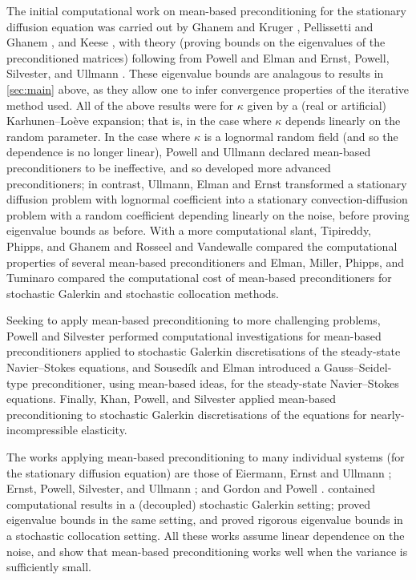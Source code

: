 The initial computational work on mean-based preconditioning for the stationary diffusion equation was carried out by Ghanem and Kruger \cite{GhKr:96}, Pellissetti and Ghanem \cite{PeGh:00}, and Keese \cite{Ke:04}, with theory (proving bounds on the eigenvalues of the preconditioned matrices) following from Powell and Elman \cite{PoEl:09} and Ernst, Powell, Silvester, and Ullmann \cite{ErPoSiUl:09}. These eigenvalue bounds are analagous to results in \cref{sec:main} above, as they allow one to infer convergence properties of the iterative method used. All of the above results were for $\kappa$ given by a (real or artificial) Karhunen--Lo\`eve expansion; that is, in the case where $\kappa$ depends linearly on the random parameter. In the case where $\kappa$ is a lognormal random field (and so the dependence is no longer linear), Powell and Ullmann \cite{PoUl:10} declared mean-based preconditioners to be ineffective, and so developed more advanced preconditioners; in contrast, Ullmann, Elman and Ernst \cite{UlElEr:12} transformed a stationary diffusion problem with lognormal coefficient into a stationary convection-diffusion problem with a random coefficient depending linearly on the noise, before proving eigenvalue bounds as before. With a more computational slant, Tipireddy, Phipps, and Ghanem \cite{TiPhGh:10} and Rosseel and Vandewalle \cite{RoVa:10} compared the computational properties of several mean-based preconditioners and Elman, Miller, Phipps, and Tuminaro \cite{ElMiPhTu:11} compared the computational cost of mean-based preconditioners for stochastic Galerkin and stochastic collocation methods.

Seeking to apply mean-based preconditioning to more challenging problems, Powell and Silvester \cite{PoSi:12} performed computational investigations for mean-based preconditioners applied to stochastic Galerkin discretisations of the steady-state Navier--Stokes equations, and Soused\'ik and Elman \cite{SoEl:16} introduced a Gauss--Seidel-type preconditioner, using mean-based ideas, for the steady-state Navier--Stokes equations. Finally, Khan, Powell, and Silvester \cite{KhPoSi:19} applied mean-based preconditioning to stochastic Galerkin discretisations of the equations for nearly-incompressible elasticity.

The works applying mean-based preconditioning to many individual systems (for the stationary diffusion equation) are those of Eiermann, Ernst and Ullmann \cite{EiErUl:07}; Ernst, Powell, Silvester, and Ullmann \cite{ErPoSiUl:09}; and Gordon and Powell \cite{GoPo:12}. \cite{EiErUl:07} contained computational results in a (decoupled) stochastic Galerkin setting; \cite{ErPoSiUl:09} proved eigenvalue bounds in the same setting, and \cite{GoPo:12} proved rigorous eigenvalue bounds in a stochastic collocation setting. All these works assume linear dependence on the noise, and show that mean-based preconditioning works well when the variance is sufficiently small.

